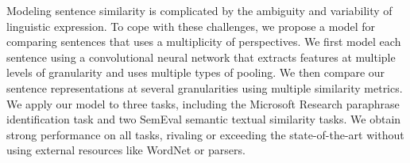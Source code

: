 Modeling sentence similarity is complicated by the ambiguity and variability of linguistic expression. To cope with these challenges, we propose a model for comparing sentences that uses a multiplicity of perspectives. We first model each sentence using a convolutional neural network that extracts features at multiple levels of granularity and uses multiple types of pooling. We then compare our sentence representations at several granularities using multiple similarity metrics. We apply our model to three tasks, including the Microsoft Research paraphrase identification task and two SemEval semantic textual similarity tasks. We obtain strong performance on all tasks, rivaling or exceeding the state-of-the-art without using external resources like WordNet or parsers.
